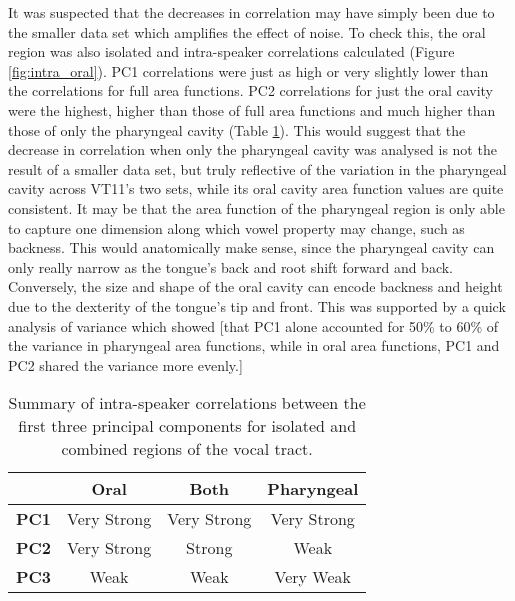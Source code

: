 It was suspected that the decreases in correlation may have simply been due to the smaller data set which amplifies the effect of noise. To check this, the oral region was also isolated and intra-speaker correlations calculated (Figure \ref{fig:intra_oral}). PC1 correlations were just as high or very slightly lower than the correlations for full area functions. PC2 correlations for just the oral cavity were the highest, higher than those of full area functions and much higher than those of only the pharyngeal cavity (Table \ref{intra-cavities}). This would suggest that the decrease in correlation when only the pharyngeal cavity was analysed is not the result of a smaller data set, but truly reflective of the variation in the pharyngeal cavity across VT11's two sets, while its oral cavity area function values are quite consistent. It may be that the area function of the pharyngeal region is only able to capture one dimension along which vowel property may change, such as backness. This would anatomically make sense, since the pharyngeal cavity can only really narrow as the tongue's back and root shift forward and back. Conversely, the size and shape of the oral cavity can encode backness and height due to the dexterity of the tongue's tip and front. This was supported by a quick analysis of variance which showed [that PC1 alone accounted for 50\% to 60\% of the variance in pharyngeal area functions, while in oral area functions, PC1 and PC2 shared the variance more evenly.]

\begin{table}[H]
\centering
\caption{Summary of intra-speaker correlations between the first three principal components for isolated and combined regions of the vocal tract.}
\label{intra-cavities}
\begin{tabular}{|c|c|c|c|}
\hline
\rowcolor[HTML]{EFEFEF} 
\textbf{} & \textbf{Oral} & \textbf{Both} & \textbf{Pharyngeal} \\ \hline
\rowcolor[HTML]{86DD85} 
\cellcolor[HTML]{EFEFEF}\textbf{PC1} & Very Strong & Very Strong & Very Strong \\ \hline
\cellcolor[HTML]{EFEFEF}\textbf{PC2} & \cellcolor[HTML]{86DD85}Very Strong & \cellcolor[HTML]{FFFC9E}Strong & \cellcolor[HTML]{F7C68C}Weak \\ \hline
\rowcolor[HTML]{F7C68C} 
\cellcolor[HTML]{EFEFEF}\textbf{PC3} & Weak & Weak & \cellcolor[HTML]{F7817E}Very Weak \\ \hline
\end{tabular}
\end{table}